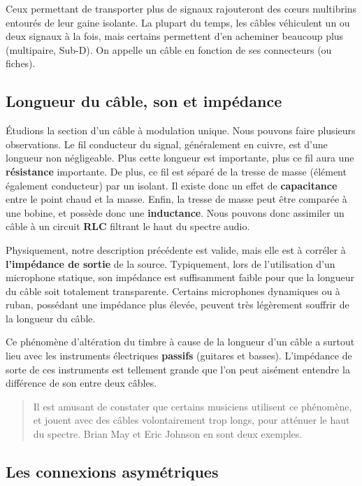 \documentclass[
  letterpaper,
  DIV=11,
  numbers=noendperiod]{scrreprt}
\begin{document}
Ceux permettant de transporter plus de signaux rajouteront des cœurs
multibrins entourés de leur gaine isolante. La plupart du temps, les
câbles véhiculent un ou deux signaux à la fois, mais certains permettent
d'en acheminer beaucoup plus (multipaire, Sub-D). On appelle un câble en
fonction de ses connecteurs (ou fiches).

\hypertarget{longueur-du-cuxe2ble-son-et-impuxe9dance}{%
\subsection{Longueur du câble, son et
impédance}\label{longueur-du-cuxe2ble-son-et-impuxe9dance}}

Étudions la section d'un câble à modulation unique. Nous pouvons faire
plusieurs observations. Le fil conducteur du signal, généralement en
cuivre, est d'une longueur non négligeable. Plus cette longueur est
importante, plus ce fil aura une \textbf{résistance} importante. De
plus, ce fil est séparé de la tresse de masse (élément également
conducteur) par un isolant. Il existe donc un effet de
\textbf{capacitance} entre le point chaud et la masse. Enfin, la tresse
de masse peut être comparée à une bobine, et possède donc une
\textbf{inductance}. Nous pouvons donc assimiler un câble à un circuit
\textbf{RLC} filtrant le haut du spectre audio.

Physiquement, notre description précédente est valide, mais elle est à
corréler à \textbf{l'impédance de sortie} de la source. Typiquement,
lors de l'utilisation d'un microphone statique, son impédance est
suffisamment faible pour que la longueur du câble soit totalement
transparente. Certains microphones dynamiques ou à ruban, possédant une
impédance plus élevée, peuvent très légèrement souffrir de la longueur
du câble.

Ce phénomène d'altération du timbre à cause de la longueur d'un câble a
surtout lieu avec les instruments électriques \textbf{passifs} (guitares
et basses). L'impédance de sorte de ces instruments est tellement grande
que l'on peut aisément entendre la différence de son entre deux câbles.

\begin{quote}
Il est amusant de constater que certains musiciens utilisent ce
phénomène, et jouent avec des câbles volontairement trop longs, pour
atténuer le haut du spectre. Brian May et Eric Johnson en sont deux
exemples.
\end{quote}

\hypertarget{les-connexions-asymuxe9triques}{%
\subsection{Les connexions
asymétriques}\label{les-connexions-asymuxe9triques}}
\end{document}
